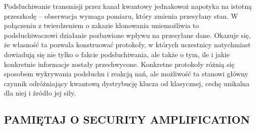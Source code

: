 \documentclass[10pt]{article}
\begin{document}
Podsłuchiwanie transmisji przez kanał kwantowy jednakowoż napotyka na istotną przeszkodę -- obserwacja
wymaga pomiaru, który zmienia przesyłany stan. W połączeniu z twierdzeniem o zakazie klonowania 
uniemożliwia to podsłuchiwaczowi działanie pozbawione wpływu na przesyłane dane. Okazuje się, że własność
ta pozwala konstruować protokoły, w których uczestnicy natychmiast dowiadują się nie tylko o fakcie
podsłuchiwania, ale także o tym, ile i jakie konkretnie informacje zostały przechwycone. Konkretne 
protokoły różnią się sposobem wykrywania podsłuchu i reakcją nań, ale możliwość ta stanowi główny 
czynnik odróżniający kwantową dystrybucję klucza od klasycznej, cechę unikalna dla niej i źródło jej 
siły.



\subsection{PAMIĘTAJ O SECURITY AMPLIFICATION}


\nocite{*}



\end{document}
